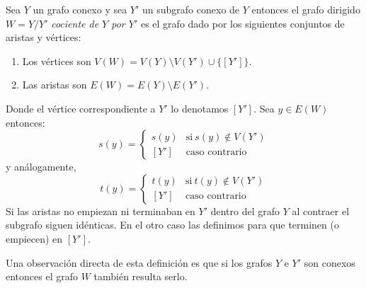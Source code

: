 \documentclass[tesis.tex]{subfiles}
\begin{document}
\begin{deff}
	Sea $Y$ un grafo conexo y sea $Y'$ un subgrafo conexo de $Y$ entonces
	el grafo dirigido $W = Y/Y'$ \emph{cociente de $Y$ por $Y'$} es el grafo dado por los siguientes conjuntos de aristas y vértices:
	
	\begin{enumerate}
		\item Los vértices son $V(W)= V(Y) \setminus V(Y') \cup \{ [Y'] \}$.
		\item Las aristas son $E(W) = E(Y) \setminus E(Y')$.
	\end{enumerate}
	Donde el vértice correspondiente a $Y'$ lo denotamos $[Y']$. 
	Sea $y \in E(W)$ entonces:
	\begin{equation*}
		s(y) = 
		\begin{cases}
			s(y)  & \text{si} \ s(y) \notin V(Y') \\ 
			[Y'] & \text{caso contrario}
		\end{cases}
	\end{equation*}
	y análogamente,
	\begin{equation*}
		t(y) = 
		\begin{cases}
			t(y)  & \text{si} \ t(y) \notin V(Y') \\ 
			[Y'] & \text{caso contrario}
		\end{cases}
	\end{equation*}
	Si las aristas no empiezan ni terminaban en $Y'$ dentro del grafo $Y$ al contraer el subgrafo siguen idénticas. 
	En el otro caso las definimos para que terminen (o empiecen) en $[Y']$. 
	
\end{deff}

Una observación directa de esta definición es que si los grafos $Y$ e $Y'$ son conexos entonces el grafo $W$ también resulta serlo.
\end{document}
